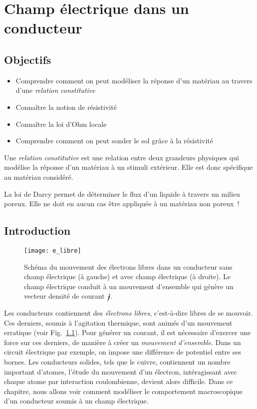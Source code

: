 \chapter{Champ électrique dans un conducteur}
\label{chap:metaux}
\section*{Objectifs}
\begin{itemize}
	\item Comprendre comment on peut modéliser la réponse 
		d'un matériau au travers d'une \emph{relation constitutive}
	\item Connaître la notion de résistivité
	\item Connaître la loi d'Ohm locale
	\item Comprendre comment on peut sonder le sol grâce à la résistivité
\end{itemize}

\begin{defn}
	Une \emph{relation constitutive} est une relation entre deux grandeurs
	physiques qui modélise la réponse d'un matériau à un stimuli extérieur.
	Elle est donc spécifique au matériau considéré.
\end{defn}

\begin{exemple}
	La loi de Darcy permet de déterminer le flux d'un liquide à travers 
	un milieu poreux. Elle ne doit en aucun cas être appliquée à un matériau
	non poreux~!
\end{exemple}
\section*{Introduction}
\begin{figure}[]
	\centering
	\texttt{[image: e\_libre]}
	\caption{Schéma du mouvement des électrons libres dans un conducteur
		 sans champ électrique (à gauche) et avec champ électrique 
	 	 (à droite). Le champ électrique conduit à un mouvement 
	 	d'ensemble qui génère un vecteur densité de courant $\mitbf{j}$.}%
	\label{fig:e_libre}
\end{figure}

Les conducteurs contiennent des \emph{électrons libres}, c'est-à-dire libres de se 
mouvoir. Ces derniers, soumis à l'agitation thermique, sont animés d'un mouvement
erratique (voir Fig.~\ref{fig:e_libre}). 
Pour générer un courant, il est nécessaire
d'exercer une force sur ces derniers, de manière à créer un \emph{mouvement d'ensemble}.
Dans un circuit électrique par exemple, on impose une différence de potentiel 
entre ses bornes. Les conducteurs solides, tels que le cuivre, contiennent
un nombre important d'atomes, l'étude du mouvement d'un électron, intéragissant
avec chaque atome par interaction coulombienne, devient alors 
difficile.
Dans ce chapitre, nous allons voir comment modéliser le comportement macroscopique 
d'un conducteur soumis à un champ électrique.
